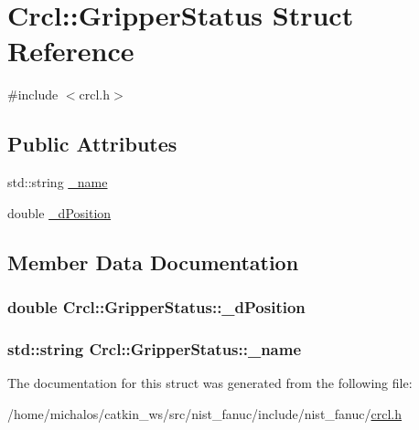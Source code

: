 \hypertarget{structCrcl_1_1GripperStatus}{\section{Crcl\-:\-:Gripper\-Status Struct Reference}
\label{structCrcl_1_1GripperStatus}
}


{\ttfamily \#include $<$crcl.\-h$>$}

\subsection*{Public Attributes}
\begin{DoxyCompactItemize}
\item 
std\-::string \hyperlink{structCrcl_1_1GripperStatus_aa6975369bf9c1d3b7711940d8dd7441d}{\-\_\-name}
\item 
double \hyperlink{structCrcl_1_1GripperStatus_a206c61416e52e3b758130c6068545cb0}{\-\_\-d\-Position}
\end{DoxyCompactItemize}


\subsection{Member Data Documentation}
\hypertarget{structCrcl_1_1GripperStatus_a206c61416e52e3b758130c6068545cb0}{
\subsubsection[{\-\_\-d\-Position}]{\setlength{\rightskip}{0pt plus 5cm}double Crcl\-::\-Gripper\-Status\-::\-\_\-d\-Position}}\label{structCrcl_1_1GripperStatus_a206c61416e52e3b758130c6068545cb0}
\hypertarget{structCrcl_1_1GripperStatus_aa6975369bf9c1d3b7711940d8dd7441d}{
\subsubsection[{\-\_\-name}]{\setlength{\rightskip}{0pt plus 5cm}std\-::string Crcl\-::\-Gripper\-Status\-::\-\_\-name}}\label{structCrcl_1_1GripperStatus_aa6975369bf9c1d3b7711940d8dd7441d}


The documentation for this struct was generated from the following file\-:\begin{DoxyCompactItemize}
\item 
/home/michalos/catkin\-\_\-ws/src/nist\-\_\-fanuc/include/nist\-\_\-fanuc/\hyperlink{crcl_8h}{crcl.\-h}\end{DoxyCompactItemize}
